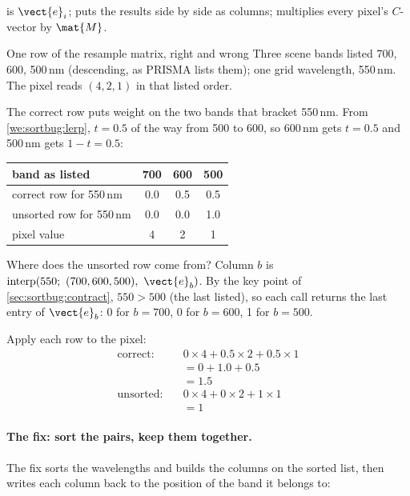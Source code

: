  is $\vect{e}_i$;  puts the results side by side as columns;
 multiplies every pixel's $C$-vector by $\mat{M}$.

\begin{worked}[label={we:sortbug:row}]{One row of the resample matrix, right and wrong}
Three scene bands listed 700, 600, 500\,nm (descending, as PRISMA lists them); one grid wavelength, 550\,nm.
The pixel reads $(4, 2, 1)$ in that listed order.

The correct row puts weight on the two bands that bracket 550\,nm. From \cref{we:sortbug:lerp}, $t = 0.5$ of
the way from 500 to 600, so 600\,nm gets $t = 0.5$ and 500\,nm gets $1 - t = 0.5$:
\begin{center}
\begin{tabular}{lccc}
\toprule
band as listed & 700 & 600 & 500 \\
\midrule
correct row for 550\,nm & 0.0 & 0.5 & 0.5 \\
unsorted row for 550\,nm & 0.0 & 0.0 & 1.0 \\
pixel value & 4 & 2 & 1 \\
\bottomrule
\end{tabular}
\end{center}
Where does the unsorted row come from? Column $b$ is $\operatorname{interp}(550;\ (700,600,500),\ \vect{e}_b)$.
By the key point of \cref{sec:sortbug:contract}, $550 > 500$ (the last listed), so each call returns the last
entry of $\vect{e}_b$: 0 for $b = 700$, 0 for $b = 600$, 1 for $b = 500$.

Apply each row to the pixel:
\begin{align*}
\text{correct:}\quad & 0 \times 4 + 0.5 \times 2 + 0.5 \times 1\\
 &= 0 + 1.0 + 0.5\\
 &= 1.5\\
\text{unsorted:}\quad & 0 \times 4 + 0 \times 2 + 1 \times 1\\
 &= 1
\end{align*}
\end{worked}

\paragraph{The fix: sort the pairs, keep them together.}
The fix sorts the wavelengths and builds the columns on the sorted list, then writes each column back to the
position of the band it belongs to:

